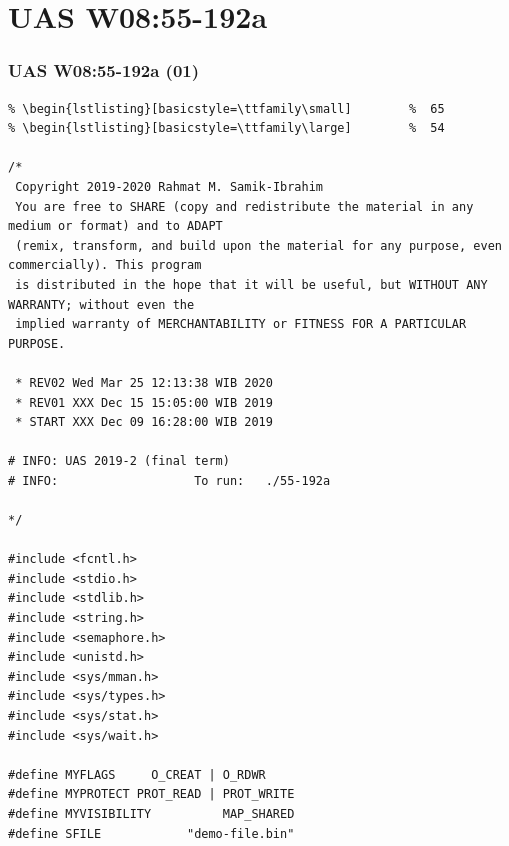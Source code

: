\documentclass[xcolor=table, notheorems, hyperref={pdfpagelabels=false}]{beamer}
\begin{document}
\section{UAS W08:55-192a}
\begin{frame}[fragile]
\frametitle{UAS W08:55-192a (01)}
\begin{lstlisting}[basicstyle=\ttfamily\tiny]         % 108
% \begin{lstlisting}[basicstyle=\ttfamily\footnotesize] %  72
% \begin{lstlisting}[basicstyle=\ttfamily\small]        %  65
% \begin{lstlisting}[basicstyle=\ttfamily\large]        %  54

/*
 Copyright 2019-2020 Rahmat M. Samik-Ibrahim
 You are free to SHARE (copy and redistribute the material in any medium or format) and to ADAPT 
 (remix, transform, and build upon the material for any purpose, even commercially). This program
 is distributed in the hope that it will be useful, but WITHOUT ANY WARRANTY; without even the 
 implied warranty of MERCHANTABILITY or FITNESS FOR A PARTICULAR PURPOSE.

 * REV02 Wed Mar 25 12:13:38 WIB 2020
 * REV01 XXX Dec 15 15:05:00 WIB 2019
 * START XXX Dec 09 16:28:00 WIB 2019

# INFO: UAS 2019-2 (final term)
# INFO:                   To run:   ./55-192a 

*/

#include <fcntl.h>
#include <stdio.h>
#include <stdlib.h>
#include <string.h>
#include <semaphore.h>
#include <unistd.h>
#include <sys/mman.h>
#include <sys/types.h>
#include <sys/stat.h>
#include <sys/wait.h>

#define MYFLAGS     O_CREAT | O_RDWR
#define MYPROTECT PROT_READ | PROT_WRITE
#define MYVISIBILITY          MAP_SHARED
#define SFILE            "demo-file.bin"

\end{lstlisting}
\end{frame}
\end{document}
